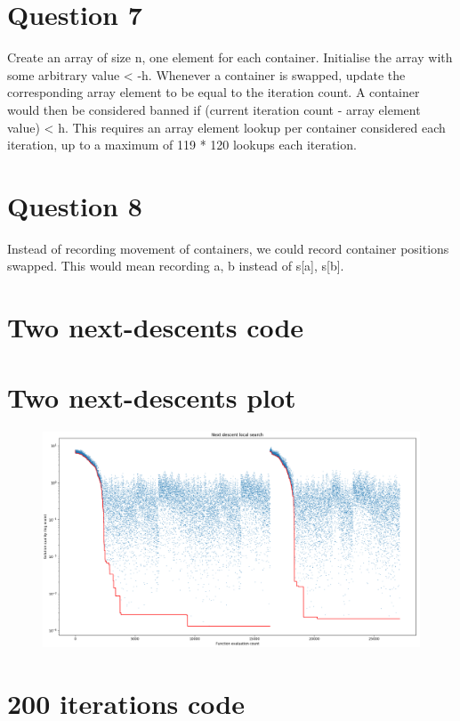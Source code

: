 \documentclass[10pt,a4paper]{article}
\begin{document}
\section*{Question 7}
Create an array of size n, one element for each container. Initialise the array with some arbitrary value < -h. Whenever a container is swapped, update the corresponding array element to be equal to the iteration count. A container would then be considered banned if (current iteration count - array element value) < h. This requires an array element lookup per container considered each iteration, up to a maximum of 119 * 120 lookups each iteration.

\section*{Question 8}
Instead of recording movement of containers, we could record container positions swapped. This would mean recording a, b instead of s[a], s[b].


\newpage
{}
\section*{Two next-descents code}

\newpage
\thispagestyle{plain}
\section*{Two next-descents plot}
\begin{figure}[H]
	\centering
	\includegraphics[width=1.4\linewidth, angle=90, origin=c]{2_descent}
\end{figure}


\newpage
\section*{200 iterations code}

\end{document}
